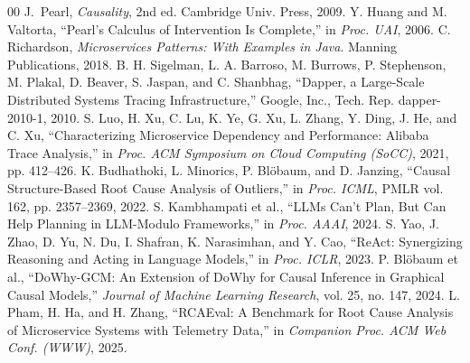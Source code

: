 \documentclass[journal, 10pt]{IEEEtran}
\begin{document}

\begin{thebibliography}{00}
J.~Pearl, \emph{Causality}, 2nd ed. Cambridge Univ. Press, 2009.
Y. Huang and M. Valtorta, ``Pearl's Calculus of Intervention Is Complete,'' in \emph{Proc. UAI}, 2006.
C. Richardson, \emph{Microservices Patterns: With Examples in Java}. Manning Publications, 2018.
B. H. Sigelman, L. A. Barroso, M. Burrows, P. Stephenson, M. Plakal, D. Beaver, S. Jaspan, and C. Shanbhag, ``Dapper, a Large-Scale Distributed Systems Tracing Infrastructure,'' Google, Inc., Tech. Rep. dapper-2010-1, 2010.
S. Luo, H. Xu, C. Lu, K. Ye, G. Xu, L. Zhang, Y. Ding, J. He, and C. Xu, ``Characterizing Microservice Dependency and Performance: Alibaba Trace Analysis,'' in \emph{Proc. ACM Symposium on Cloud Computing (SoCC)}, 2021, pp. 412--426.
K. Budhathoki, L. Minorics, P. Blöbaum, and D. Janzing, ``Causal Structure-Based Root Cause Analysis of Outliers,'' in \emph{Proc. ICML}, PMLR vol. 162, pp. 2357--2369, 2022.
S. Kambhampati et al., ``LLMs Can't Plan, But Can Help Planning in LLM-Modulo Frameworks,'' in \emph{Proc. AAAI}, 2024.
S. Yao, J. Zhao, D. Yu, N. Du, I. Shafran, K. Narasimhan, and Y. Cao, ``ReAct: Synergizing Reasoning and Acting in Language Models,'' in \emph{Proc. ICLR}, 2023.
P. Blöbaum et al., ``DoWhy-GCM: An Extension of DoWhy for Causal Inference in Graphical Causal Models,'' \emph{Journal of Machine Learning Research}, vol. 25, no. 147, 2024.
L. Pham, H. Ha, and H. Zhang, ``RCAEval: A Benchmark for Root Cause Analysis of Microservice Systems with Telemetry Data,'' in \emph{Companion Proc. ACM Web Conf. (WWW)}, 2025.


\end{thebibliography}
\end{document}
